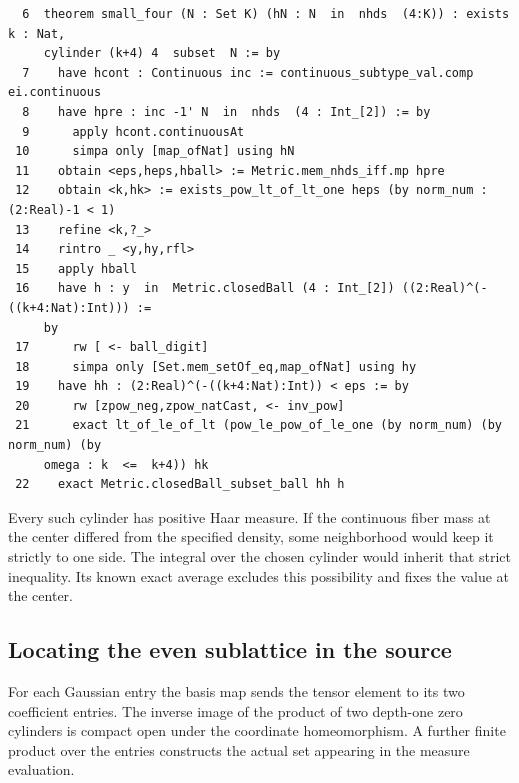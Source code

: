 \documentclass[12pt,letterpaper]{article}
\begin{document}
{\fontsize{9.2}{11.2}\selectfont\begin{verbatim}
  6  theorem small_four (N : Set K) (hN : N  in  nhds  (4:K)) : exists  k : Nat,
     cylinder (k+4) 4  subset  N := by
  7    have hcont : Continuous inc := continuous_subtype_val.comp ei.continuous
  8    have hpre : inc -1' N  in  nhds  (4 : Int_[2]) := by
  9      apply hcont.continuousAt
 10      simpa only [map_ofNat] using hN
 11    obtain <eps,heps,hball> := Metric.mem_nhds_iff.mp hpre
 12    obtain <k,hk> := exists_pow_lt_of_lt_one heps (by norm_num : (2:Real)-1 < 1)
 13    refine <k,?_>
 14    rintro _ <y,hy,rfl>
 15    apply hball
 16    have h : y  in  Metric.closedBall (4 : Int_[2]) ((2:Real)^(-((k+4:Nat):Int))) :=
     by
 17      rw [ <- ball_digit]
 18      simpa only [Set.mem_setOf_eq,map_ofNat] using hy
 19    have hh : (2:Real)^(-((k+4:Nat):Int)) < eps := by
 20      rw [zpow_neg,zpow_natCast, <- inv_pow]
 21      exact lt_of_le_of_lt (pow_le_pow_of_le_one (by norm_num) (by norm_num) (by
     omega : k  <=  k+4)) hk
 22    exact Metric.closedBall_subset_ball hh h
\end{verbatim}}
Every such cylinder has positive Haar measure. If the continuous fiber mass at the center differed from the specified density, some neighborhood would keep it strictly to one side. The integral over the chosen cylinder would inherit that strict inequality. Its known exact average excludes this possibility and fixes the value at the center.
\clearpage{}\subsection*{Locating the even sublattice in the source}\label{extract-FourEndpoint11}
For each Gaussian entry the basis map sends the tensor element to its two coefficient entries. The inverse image of the product of two depth-one zero cylinders is compact open under the coordinate homeomorphism. A further finite product over the entries constructs the actual set appearing in the measure evaluation.
\par
\end{document}
